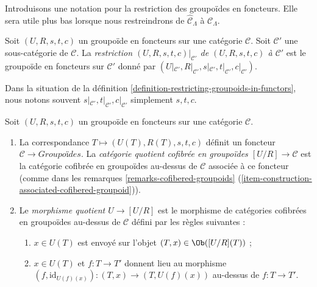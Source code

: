 \noindent
Introduisons une notation pour la restriction des groupoïdes en foncteurs. Elle
sera utile plus bas lorsque nous restreindrons de $\widehat{\mathcal
C}_\Lambda$ à $\mathcal{C}_\Lambda$.

\begin{definition}
\label{definition-restricting-groupoids-in-functors}
Soit $(U, R, s, t, c)$ un groupoïde en foncteurs sur une catégorie
$\mathcal{C}$. Soit $\mathcal{C}'$ une sous-catégorie de $\mathcal{C}$. La
{\it restriction $(U, R, s, t, c)|_{\mathcal{C}'}$ de $(U, R, s, t, c)$ à
$\mathcal{C}'$} est le groupoïde en foncteurs sur $\mathcal{C}'$ donné par
$(U|_{\mathcal{C}'}, R|_{\mathcal
C'}, s|_{\mathcal{C}'}, t|_{\mathcal{C}'}, c|_{\mathcal{C}'})$.
\end{definition}

\begin{remark}
\label{remark-notation-restriction}
Dans la situation de la définition
\ref{definition-restricting-groupoids-in-functors}, nous notons souvent
$s|_{\mathcal{C}'}, t|_{\mathcal{C}'}, c|_{\mathcal{C}'}$ simplement $s, t, c$.
\end{remark}

\begin{definition}
\label{definition-quotient}
Soit $(U, R, s, t, c)$ un groupoïde en foncteurs sur une catégorie
$\mathcal{C}$.
\begin{enumerate}
\item La correspondance $T \mapsto  (U(T), R(T), s, t, c)$ définit un foncteur
$\mathcal{C} \to \textit{Groupoïdes}$. La {\it catégorie quotient cofibrée en
groupoïdes $[U/R] \to \mathcal{C}$} est la catégorie cofibrée en groupoïdes
au-dessus de $\mathcal{C}$ associée à ce foncteur (comme dans les remarques
\ref{remarks-cofibered-groupoids}
(\ref{item-construction-associated-cofibered-groupoid})).
\item Le {\it morphisme quotient $U \to [U/R]$} est le morphisme de catégories
cofibrées en groupoïdes au-dessus de $\mathcal{C}$ défini par les règles
suivantes :
\begin{enumerate}
\item $x \in U(T)$ est envoyé sur l'objet $(T, x) \in \Ob([U/R](T))$ ;
\item $x \in U(T)$ et $f : T \to T'$ donnent lieu au morphisme
$(f, \text{id}_{U(f)(x)}): (T, x) \to (T, U(f)(x))$ au-dessus de
$f : T \to T'$.
\end{enumerate}
\end{enumerate}
\end{definition}





